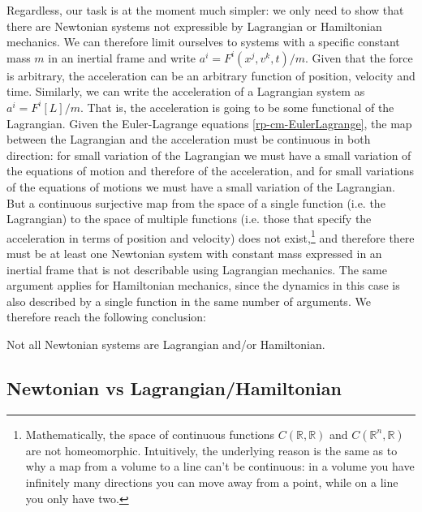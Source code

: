 Regardless, our task is at the moment much simpler: we only need to show that there are Newtonian systems not expressible by Lagrangian or Hamiltonian mechanics. We can therefore limit ourselves to systems with a specific constant mass $m$ in an inertial frame and write $a^i=F^i(x^j, v^k, t)/m$. Given that the force is arbitrary, the acceleration can be an arbitrary function of position, velocity and time. Similarly, we can write the acceleration of a Lagrangian system as $a^i=F^i[L]/m$. That is, the acceleration is going to be some functional of the Lagrangian. Given the Euler-Lagrange equations \ref{rp-cm-EulerLagrange}, the map between the Lagrangian and the acceleration must be continuous in both direction: for small variation of the Lagrangian we must have a small variation of the equations of motion and therefore of the acceleration, and for small variations of the equations of motions we must have a small variation of the Lagrangian. But a continuous surjective map from the space of a single function (i.e. the Lagrangian) to the space of multiple functions (i.e. those that specify the acceleration in terms of position and velocity) does not exist,\footnote{Mathematically, the space of continuous functions $C(\mathbb{R}, \mathbb{R})$ and $C(\mathbb{R}^n, \mathbb{R})$ are not homeomorphic. Intuitively, the underlying reason is the same as to why a map from a volume to a line can't be continuous: in a volume you have infinitely many directions you can move away from a point, while on a line you only have two.} and therefore there must be at least one Newtonian system with constant mass expressed in an inertial frame that is not describable using Lagrangian mechanics. The same argument applies for Hamiltonian mechanics, since the dynamics in this case is also described by a single function in the same number of arguments. We therefore reach the following conclusion:
\begin{insight}
	Not all Newtonian systems are Lagrangian and/or Hamiltonian.
\end{insight}

\subsection{Newtonian vs Lagrangian/Hamiltonian}

